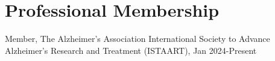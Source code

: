 \section{\mysidestyle Professional Membership}
Member, The Alzheimer's Association International Society to Advance Alzheimer's Research and Treatment (ISTAART), Jan 2024-Present\\